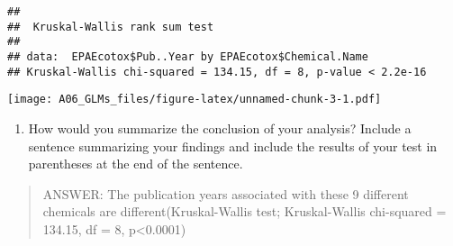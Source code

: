 \documentclass[]{article}
\newenvironment{Shaded}{\begin{snugshade}}{\end{snugshade}}
\newcommand{\KeywordTok}[1]{\textcolor[rgb]{0.13,0.29,0.53}{\textbf{#1}}}
\newcommand{\DataTypeTok}[1]{\textcolor[rgb]{0.13,0.29,0.53}{#1}}
\newcommand{\DecValTok}[1]{\textcolor[rgb]{0.00,0.00,0.81}{#1}}
\newcommand{\StringTok}[1]{\textcolor[rgb]{0.31,0.60,0.02}{#1}}
\newcommand{\CommentTok}[1]{\textcolor[rgb]{0.56,0.35,0.01}{\textit{#1}}}
\newcommand{\OperatorTok}[1]{\textcolor[rgb]{0.81,0.36,0.00}{\textbf{#1}}}
\newcommand{\NormalTok}[1]{#1}
\providecommand{\tightlist}{%
  \setlength{\itemsep}{0pt}\setlength{\parskip}{0pt}}
\begin{document}
\begin{Shaded}
\end{Shaded}

\begin{verbatim}
## 
##  Kruskal-Wallis rank sum test
## 
## data:  EPAEcotox$Pub..Year by EPAEcotox$Chemical.Name
## Kruskal-Wallis chi-squared = 134.15, df = 8, p-value < 2.2e-16
\end{verbatim}

\begin{Shaded}
\end{Shaded}

\texttt{[image: A06\_GLMs\_files/figure-latex/unnamed-chunk-3-1.pdf]}

\begin{enumerate}
\def\labelenumi{\arabic{enumi}.}
\setcounter{enumi}{8}
\tightlist
\item
  How would you summarize the conclusion of your analysis? Include a
  sentence summarizing your findings and include the results of your
  test in parentheses at the end of the sentence.
\end{enumerate}

\begin{quote}
ANSWER: The publication years associated with these 9 different
chemicals are different(Kruskal-Wallis test; Kruskal-Wallis chi-squared
= 134.15, df = 8, p\textless{}0.0001)
\end{quote}
\end{document}
